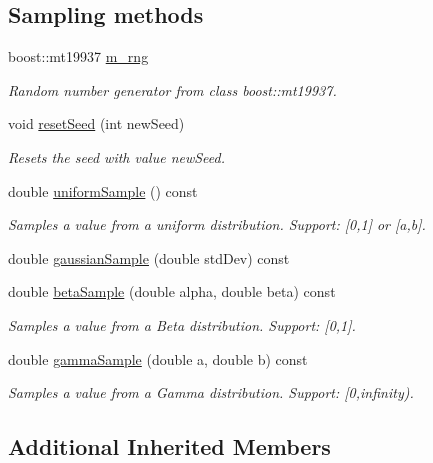 \subsection*{Sampling methods}
\begin{DoxyCompactItemize}
\item 
boost\-::mt19937 \hyperlink{class_q_u_e_s_o_1_1_rng_boost_aef65914cae8b11e345bfb082db616f0e}{m\-\_\-rng}
\begin{DoxyCompactList}\small\item\em Random number generator from class boost\-::mt19937. \end{DoxyCompactList}\item 
void \hyperlink{class_q_u_e_s_o_1_1_rng_boost_a94c246d855ea22332b0dafc0891e328f}{reset\-Seed} (int new\-Seed)
\begin{DoxyCompactList}\small\item\em Resets the seed with value {\ttfamily new\-Seed}. \end{DoxyCompactList}\item 
double \hyperlink{class_q_u_e_s_o_1_1_rng_boost_aad1548eec706aeb6580af163bd80e0a9}{uniform\-Sample} () const 
\begin{DoxyCompactList}\small\item\em Samples a value from a uniform distribution. Support\-: \mbox{[}0,1\mbox{]} or \mbox{[}a,b\mbox{]}. \end{DoxyCompactList}\item 
double \hyperlink{class_q_u_e_s_o_1_1_rng_boost_a9d33a495101b353e267ea7d3a6df361f}{gaussian\-Sample} (double std\-Dev) const 
\item 
double \hyperlink{class_q_u_e_s_o_1_1_rng_boost_ab859b0ff1e728c6a65c2aef62afe028e}{beta\-Sample} (double alpha, double beta) const 
\begin{DoxyCompactList}\small\item\em Samples a value from a Beta distribution. Support\-: \mbox{[}0,1\mbox{]}. \end{DoxyCompactList}\item 
double \hyperlink{class_q_u_e_s_o_1_1_rng_boost_ae4fcb113ba19dbec7684f41c3aebf4e7}{gamma\-Sample} (double a, double b) const 
\begin{DoxyCompactList}\small\item\em Samples a value from a Gamma distribution. Support\-: \mbox{[}0,infinity). \end{DoxyCompactList}\end{DoxyCompactItemize}
\subsection*{Additional Inherited Members}


